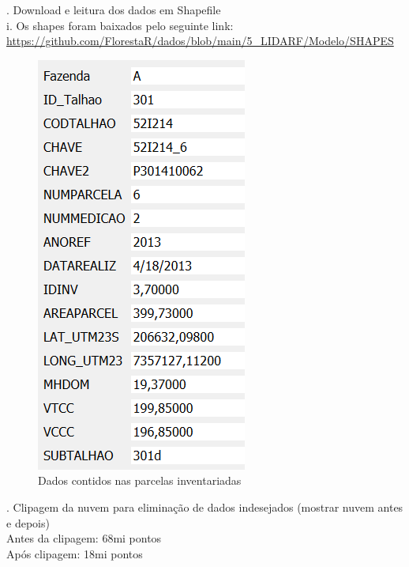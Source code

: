 \documentclass[
]{article}
\begin{document}

. Download e leitura dos dados em Shapefile\\
i. Os shapes foram baixados pelo seguinte link:
\url{https://github.com/FlorestaR/dados/blob/main/5_LIDARF/Modelo/SHAPES}

\begin{figure}

{\centering \includegraphics[width=0.5\linewidth]{IMAGES/atributosinventariadas} 

}

\caption{Dados contidos nas parcelas inventariadas}\label{fig:unnamed-chunk-10}
\end{figure}


. Clipagem da nuvem para eliminação de dados indesejados (mostrar nuvem
antes e depois)\\
Antes da clipagem: 68mi pontos\\
Após clipagem: 18mi pontos
\end{document}
